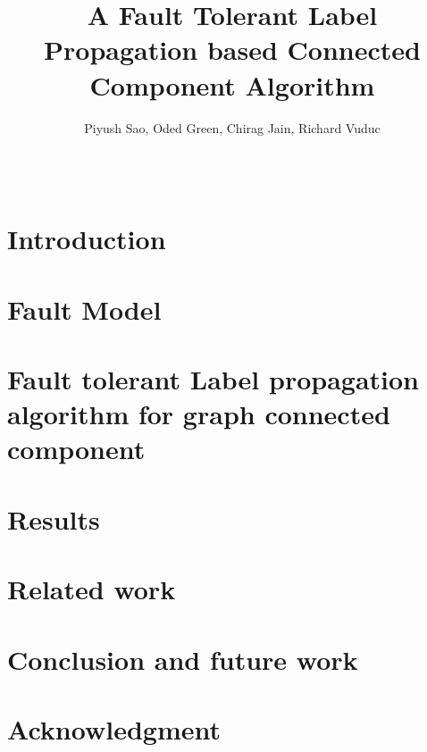 \documentclass{sig-alternate-05-2015}
\begin{document}

\title{A Fault Tolerant Label Propagation based Connected Component Algorithm }

  \author{
  \alignauthor
    Piyush Sao, Oded Green, Chirag Jain, Richard Vuduc \\
      \\
      \\
  }


\maketitle





\section{Introduction}


\section{Fault Model}


\section{Fault tolerant Label propagation algorithm for graph connected component}


\section{Results}


\section{Related work}


\section{Conclusion and future work}


\section{Acknowledgment}

\end{document}
